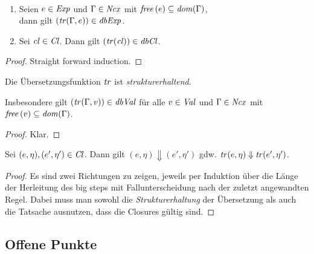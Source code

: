 \documentclass[12pt,fleqn,a4paper]{article}
\newcommand{\Cl}{\name{Cl}}
\newcommand{\cl}{\name{cl}}
\begin{document}
\begin{lemma} \
  \begin{enumerate}
  \item Seien $e \in {\text{\it Exp\/}}$ und $\Gamma\in{\text{\it Ncx\/}}$ mit ${\text{\it free\/}}\,(e)\subseteq {\text{\it dom\/}}(\Gamma)$, \\
    dann gilt $({\text{\it tr\/}}(\Gamma,e))\in{\text{\it dbExp\/}}$.
  \item Sei $\cl\in\Cl$. Dann gilt $(\tr{\cl})\in\dbCl$.
  \end{enumerate}
\end{lemma}

\begin{proof}
  Straight forward induction.
\end{proof}

\begin{lemma}
  Die \"Ubersetzungsfunktion ${\text{\it tr\/}}$ ist {\em strukturerhaltend}.
\end{lemma}

Insbesondere gilt $({\text{\it tr\/}}(\Gamma,v))\in{\text{\it dbVal\/}}$ f\"ur alle $v\in{\text{\it Val\/}}$ und $\Gamma\in{\text{\it Ncx\/}}$ mit
${\text{\it free\/}}\,(v)\subseteq{\text{\it dom\/}}(\Gamma)$.

\begin{proof}
  Klar.
\end{proof}

\begin{theorem}[\"Aquivalenzsatz]
  Sei $(e,\eta),(e',\eta')\in\Cl$. Dann gilt $(e,\eta) \Downarrow (e',\eta')$ gdw.
  ${\text{\it tr\/}}(e,\eta) \Downarrow {\text{\it tr\/}}(e',\eta')$.
\end{theorem}

\begin{proof}
  Es sind zwei Richtungen zu zeigen, jeweils per Induktion \"uber die L\"ange der Herleitung des big steps mit
  Fallunterscheidung nach der zuletzt angewandten Regel. Dabei muss man sowohl die {\em Strukturerhaltung} der
  \"Ubersetzung als auch die Tatsache ausnutzen, dass die Closures g\"ultig sind.
\end{proof}

\subsection*{Offene Punkte}
\end{document}
